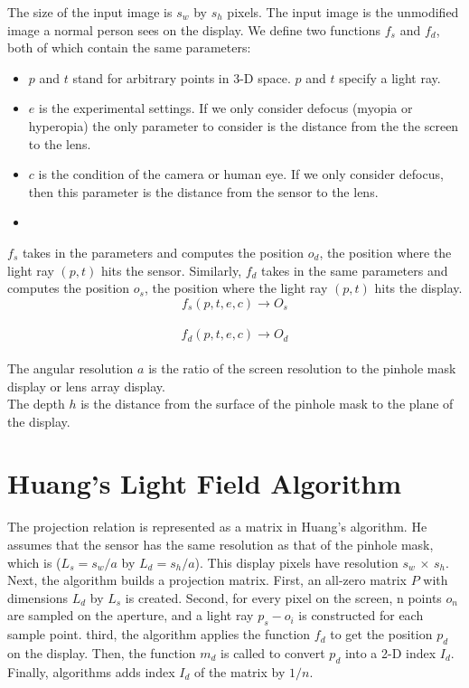 The size of the input image is $s_w$ by $s_h$ pixels. The input image is the unmodified image a normal person sees on the display.
We define two functions $f_s$ and $f_d$, both of which contain the same parameters:
\begin{itemize}
\item $p$ and $t$ stand for arbitrary points in 3-D space. $p$ and $t$ specify a light ray.

\item $e$ is the experimental settings. If we only consider defocus (myopia or hyperopia) the only parameter to consider is the distance from the the screen to the lens.

\item $c$ is the condition of the camera or human eye. If we only consider defocus, then this parameter is the distance from the sensor to the lens.

\item
\end{itemize}

$f_s$ takes in the parameters and computes the position $o_d$, the position where the light ray $(p,t)$ hits the sensor. Similarly, $f_d$ takes in the same parameters and computes the position $o_s$, the position where the light ray $(p, t)$ hits the display. \\
$$f_s(p, t, e, c) \rightarrow O_s$$ \\
$$f_d(p, t, e, c) \rightarrow O_d$$ \\
The angular resolution $a$ is the ratio of the screen resolution to the pinhole mask display or lens array display. \\
The depth $h$ is the distance from the surface of the pinhole mask to the plane of the display.

\section{Huang's Light Field Algorithm}

The projection relation is represented as a matrix in Huang's algorithm. He assumes that the sensor has the same resolution as that of the pinhole mask, which is ($L_s = s_w / a$ by $L_d = s_h / a$). This display pixels have resolution $s_w$ $\times$ $s_h$. 
Next, the algorithm builds a projection matrix. First, an all-zero matrix $P$ with dimensions $L_d$ by $L_s$ is created. Second, for every pixel on the screen, n points $o_n$ are sampled on the aperture, and a light ray $p_s - o_i$ is constructed for each sample point. third, the algorithm applies the function $f_d$ to get the position $p_d$ on the display. Then, the function $m_d$ is called to convert $p_d$ into a 2-D index $I_d$. Finally, algorithms adds index $I_d$ of the matrix by $1/n$. 

